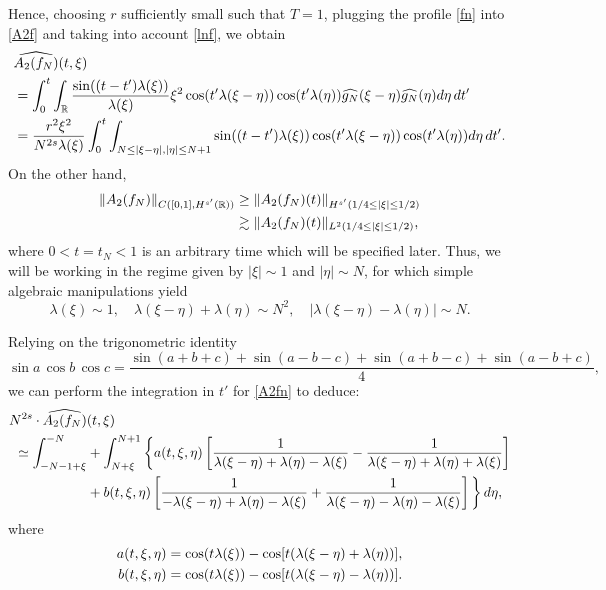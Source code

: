 \documentclass{amsart}
\begin{document}
Hence, choosing $r$ sufficiently small such that $T=1$, plugging the profile \eqref{fn} into \eqref{A2f} and taking into account \eqref{lnf}, we obtain
\begin{equation}
\aligned
&\widehat{A_2(f_N)}(t,\xi)\\
&=\int_0^t \int_{\mathbb{R}} \frac{\sin((t-t') \lambda(\xi))}{\lambda(\xi)} \xi^2 \cos(t' \lambda(\xi-\eta))\cos(t'\lambda(\eta))\widehat{g_N}(\xi-\eta)\widehat{g_N}(\eta)d\eta\,dt'\\
&=\frac{r^2 \xi^2}{N^{2s}\lambda(\xi)}\int_0^t \int_{N \leq |\xi-\eta|, |\eta| \leq N+1}\sin((t-t') \lambda(\xi))\cos(t' \lambda(\xi-\eta))\cos(t'\lambda(\eta))d\eta\,dt'.\endaligned
\label{A2fn}
\end{equation}
On the other hand,
\begin{equation}
\aligned
\|A_2(f_N)\|_{C([0,1], H^{s'}(\mathbb{R}))} &\geq \|A_2(f_N)(t)\|_{H^{s'}(1/4\leq |\xi| \leq 1/2)}\\ &\gtrsim \|A_2(f_N)(t)\|_{L^2(1/4\leq |\xi| \leq 1/2)},\label{hsA2}
\endaligned
\end{equation}
where $0<t=t_N<1$ is an arbitrary time which will be specified later. Thus, we will be working in the regime given by $ |\xi|\sim 1$ and $|\eta|\sim N$, for which simple algebraic manipulations yield
\begin{equation}
\lambda(\xi) \sim 1,\quad \lambda(\xi-\eta)+\lambda(\eta) \sim N^2, \quad \left| \lambda(\xi-\eta)-\lambda(\eta)\right| \sim N.
\label{aprox}
\end{equation}

Relying on the trigonometric identity
\[
\sin a\,\cos b\,\cos c=\frac{\sin (a+b+c)+\sin (a-b-c)+\sin (a+b-c)+\sin (a-b+c)}{4},
\]
we can perform the integration in $t'$ for \eqref{A2fn} to deduce:
\begin{equation}
\aligned
N^{2s}\cdot \widehat{A_2(f_N)}&(t,\xi)\\ 
\simeq  \int_{- N-1+\xi}^{-N} &+\int_{N+\xi}^{N+1} \bigg\{ a(t,\xi,\eta) \left[ \frac{1}{\lambda(\xi - \eta) + \lambda(\eta)- \lambda(\xi)} - \frac{1}{\lambda(\xi - \eta) + \lambda(\eta)+\lambda(\xi)} \right]\\
&+b(t,\xi,\eta) \left[ \frac{1}{-\lambda(\xi - \eta) + \lambda(\eta)-\lambda(\xi)} + \frac{1}{\lambda(\xi - \eta) - \lambda(\eta)-\lambda(\xi)} \right]\bigg\}\,d\eta,
\endaligned
\end{equation}
where
\begin{equation}\aligned
a(t,\xi,\eta)&= \cos (t\lambda(\xi))-\cos[t(\lambda(\xi - \eta) + \lambda(\eta))],\\ b(t,\xi,\eta)&= \cos (t\lambda(\xi))-\cos[t(\lambda(\xi - \eta) - \lambda(\eta))].
\endaligned
\end{equation}
\end{document}
